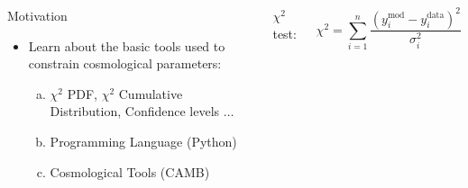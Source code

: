 \documentclass[a4paper,10pt]{beamer}
\begin{document}
\begin{frame}
\begin{columns}[c]
  \column{2.3in}
  \begin{block}{Motivation}
  \begin{itemize}
   \item Learn about the basic tools used to constrain cosmological parameters:
   \begin{enumerate}[(a)]
    \item $\chi^2$ PDF, $\chi^2$ Cumulative Distribution, Confidence levels $\dots$
    \item Programming Language (Python)
    \item Cosmological Tools (CAMB)
   \end{enumerate}
  \end{itemize}
 \end{block}
  \column{2in}
  $\chi^2$ test:
  
  \begin{equation}
   \chi^2 = \sum_{i=1}^n \frac{(y_i^{\text{mod}} - y_i^{\text{data}})^2}{\sigma_i^2}
  \end{equation}

\end{columns}
\end{frame}
\end{document}
